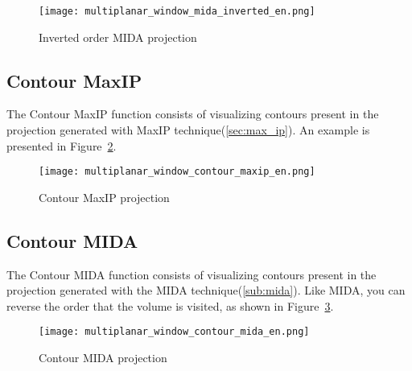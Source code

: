 \begin{figure}[!h]
\centering
\texttt{[image: multiplanar\_window\_mida\_inverted\_en.png]}
\caption{Inverted order MIDA projection}
\label{fig:proj_MIDA_inv}
\end{figure}

\subsection{Contour MaxIP}

The Contour MaxIP function consists of visualizing contours present in the projection generated with MaxIP technique(\ref{sec:max_ip}). An example is presented in Figure~\ref{fig:proj_contorno_maxip}.

\begin{figure}[!h]
\centering
\texttt{[image: multiplanar\_window\_contour\_maxip\_en.png]}
\caption{Contour MaxIP projection}
\label{fig:proj_contorno_maxip}
\end{figure}

\subsection{Contour MIDA}

The Contour MIDA function consists of visualizing contours present in the projection generated with the MIDA technique(\ref{sub:mida}). Like MIDA, you can reverse the order that the volume is visited, as shown in Figure~\ref{fig:proj_contorno_mida}.

\begin{figure}[!h]
\centering
\texttt{[image: multiplanar\_window\_contour\_mida\_en.png]}
\caption{Contour MIDA projection}
\label{fig:proj_contorno_mida}
\end{figure}